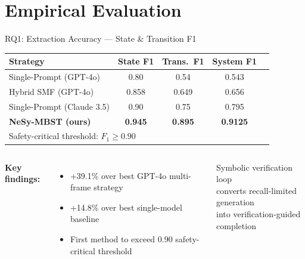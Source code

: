 \documentclass[aspectratio=169,10pt]{beamer}
\newcommand{\pos}[1]{\textcolor{positive}{#1}}
\newcommand{\HL}[1]{\textcolor{emphasis}{#1}}
\begin{document}
\section{Empirical Evaluation}

\begin{frame}{RQ1: Extraction Accuracy — State \& Transition F1}
  \vspace{0.3em}
  \begin{center}
  \small
  \begin{tabular}{l ccc c}
    \toprule
    \textbf{Strategy} & \textbf{State F1} & \textbf{Trans.\ F1} & \textbf{System F1} \\
    \midrule
    Single-Prompt (GPT-4o)      & 0.80 & 0.54 & 0.543 \\
    Hybrid SMF (GPT-4o)         & 0.858 & 0.649 & 0.656 \\
    Single-Prompt (Claude 3.5)  & 0.90 & 0.75 & 0.795 \\
    \midrule
    \textbf{NeSy-MBST (ours)}   & \textbf{0.945} & \textbf{0.895} & \textbf{0.9125} \\
    \midrule
    \multicolumn{4}{l}{\small\textcolor{neutral}{Safety-critical threshold: $F_1 \geq 0.90$}} \\
    \bottomrule
  \end{tabular}
  \end{center}
  \vspace{0.4em}
  \begin{columns}[T]
      \textbf{Key findings:}
      \begin{itemize}
        \item \pos{+39.1\%} over best GPT-4o multi-frame strategy
        \item \pos{+14.8\%} over best single-model baseline
        \item First method to exceed 0.90 safety-critical threshold
      \end{itemize}
      \begin{exampleblock}{}
        \centering Symbolic verification loop\\
        converts recall-limited generation\\
        into \HL{verification-guided completion}
      \end{exampleblock}
  \end{columns}
\end{frame}
\end{document}
